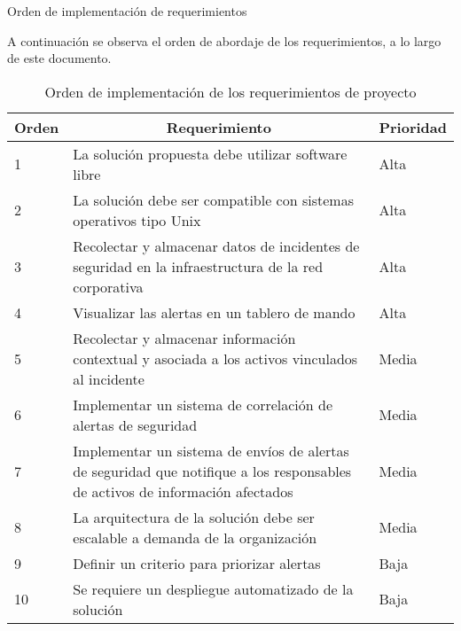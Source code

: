     \begin{section}{Orden de implementación de requerimientos}
    
    A continuación se observa el orden de abordaje de los requerimientos, a lo largo de este documento. \par
    
    \begin{table}[h]
    \begin{tabular}{|m{3em}|m{26em}|m{4em}|}
    \hline
    \multicolumn{1}{|l|}{Orden} & \multicolumn{1}{c|}{Requerimiento}                                                                                            & Prioridad \\ \hline
    1     & La solución propuesta debe utilizar software libre                                                                            & Alta      \\ \hline
    2     & La solución debe ser compatible con sistemas operativos tipo Unix                                                             & Alta      \\ \hline
    3     & Recolectar y almacenar datos de incidentes de seguridad en la infraestructura de la red corporativa                           & Alta      \\ \hline
    4     & Visualizar las alertas en un tablero de mando                                                                                 & Alta      \\ \hline
    5     & Recolectar y almacenar información contextual y asociada a los activos vinculados al incidente                                & Media     \\ \hline
    6     & Implementar un sistema de correlación de alertas de seguridad                                                                  & Media     \\ \hline
    7     & Implementar un sistema de envíos de alertas de seguridad que notifique a los responsables de activos de información afectados & Media     \\ \hline
    8     & La arquitectura de la solución debe ser escalable a demanda de la organización                                                & Media     \\ \hline
    9     & Definir un criterio para priorizar alertas                                                                                    & Baja      \\ \hline
    10    & Se requiere un despliegue automatizado de la solución                                                                         & Baja      \\ \hline
    \end{tabular}
    \caption{Orden de implementación de los requerimientos de proyecto}
    \label{table:13}
    \end{table}
    
    \end{section}
    
